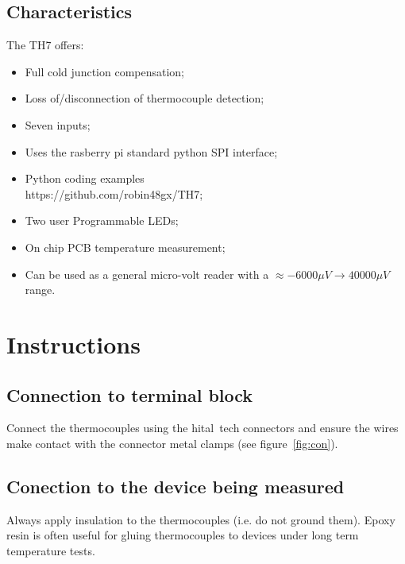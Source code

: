 \documentclass[10pt,foldmark]{leaflet}
\begin{document}
\subsection{Characteristics}
The TH7 offers:
\begin{itemize}
 \item Full cold junction compensation;
 \item Loss of/disconnection of thermocouple detection;
 \item Seven inputs;
 \item Uses the rasberry pi standard python SPI interface;
 \item Python coding examples \\ https://github.com/robin48gx/TH7;
 \item Two user Programmable LEDs;
 \item On chip PCB temperature measurement;
  \item Can be used as a general micro-volt reader with a $\approx -6000 \mu V \rightarrow 40000 \mu V$ range.
\end{itemize} 

\section{Instructions}
\subsection{Connection to terminal block}
%
Connect the thermocouples using the hital~tech connectors and ensure the wires make contact with the 
connector metal clamps (see figure~\ref{fig:con}).
%
\subsection{Conection to the device being measured}
%
Always apply insulation to the thermocouples (i.e. do not ground them).
%
Epoxy resin is often useful for gluing thermocouples to devices under long term temperature tests.
\end{document}
